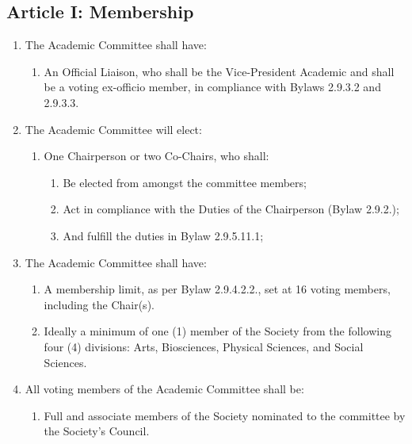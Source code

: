 \subsection{Article I: Membership}
\begin{enumerate}[label*=\arabic*., align=left]	
\item The Academic Committee shall have:
\begin{enumerate}[label*=\arabic*., align=left]	
\item An Official Liaison, who shall be the Vice-President Academic and shall be a voting ex-officio member, in compliance with Bylaws 2.9.3.2 and 2.9.3.3.
\end{enumerate}
\item The Academic Committee will elect:
\begin{enumerate}[label*=\arabic*., align=left]
\item One Chairperson or two Co-Chairs, who shall:
\begin{enumerate}[label*=\arabic*., align=left]
\item Be elected from amongst the committee members;
\item Act in compliance with the Duties of the Chairperson (Bylaw 2.9.2.);
\item And fulfill the duties in Bylaw 2.9.5.11.1;
\end{enumerate}
\end{enumerate}
\item The Academic Committee shall have:
\begin{enumerate}[label*=\arabic*., align=left]
\item A membership limit, as per Bylaw 2.9.4.2.2., set at 16 voting members, including the Chair(s).
\item Ideally a minimum of one (1) member of the Society from the following four (4) divisions: Arts, Biosciences, Physical Sciences, and Social Sciences.
\end{enumerate}
\item All voting members of the Academic Committee shall be:
\begin{enumerate}[label*=\arabic*., align=left]
\item Full and associate members of the Society nominated to the committee by the Society's Council.
\end{enumerate}
\end{enumerate}

